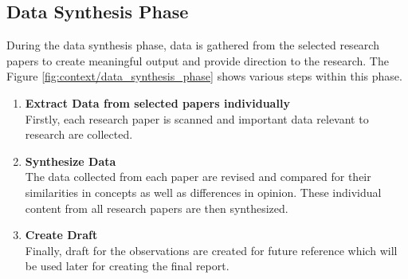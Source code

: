 \begin{enumerate}
\subsection{Data Synthesis Phase}\label{section:context/approach/data_synthesis_phase}
During the data synthesis phase, data is gathered from the selected research papers to create meaningful output and provide direction to the research. The Figure \ref{fig:context/data_synthesis_phase} shows various steps within this phase.

\begin{enumerate}
\item \textbf{Extract Data from selected papers individually}\\
Firstly, each research paper is scanned and important data relevant to research are collected.
\item \textbf{Synthesize Data}\\
The data collected from each paper are revised and compared for their similarities in concepts as well as differences in opinion. These individual content from all research papers are then synthesized.
\item \textbf{Create Draft}\\
Finally, draft for the observations are created for future reference which will be used later for creating the final report.
\end{enumerate}



\end{enumerate}
